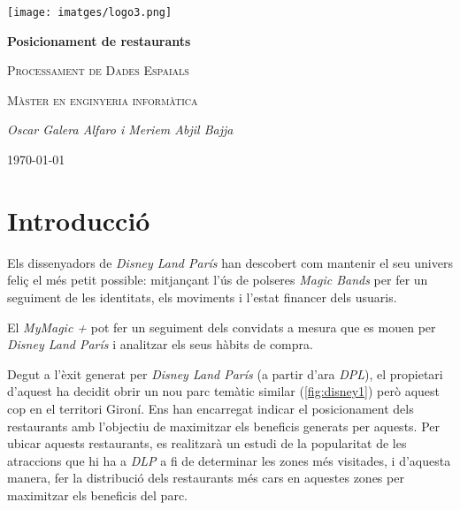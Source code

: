 \documentclass[12pt]{article}
\begin{document}
\begin{titlepage}
		\centering
		\texttt{[image: imatges/logo3.png]}\par\vspace{1cm}
		{\huge\bfseries Posicionament de restaurants\par}
		\vspace{0.3cm}
		{\scshape\Large Processament de Dades Espaials\par}
		\vspace{0.2cm}
		{\scshape\Large Màster en enginyeria informàtica\par}
		\vspace{1.5cm}
		{\Large\itshape Oscar Galera Alfaro i Meriem Abjil Bajja\par}
		\vfill
		{\large \today\par}
\end{titlepage}
\tableofcontents

\clearpage

\listoffigures

\clearpage

\section{Introducció}

Els dissenyadors de \textit{Disney Land París} han descobert com mantenir el seu univers feliç el més petit possible: mitjançant l'ús de polseres \textit{Magic Bands} per fer un seguiment de les identitats, els moviments i l'estat financer dels usuaris.

El \textit{MyMagic +}  pot fer un seguiment dels convidats a mesura que es mouen per \textit{Disney Land París} i analitzar els seus hàbits de compra.

Degut a l'èxit generat per \textit{Disney Land París} (a partir d'ara \textit{DPL}), el propietari d'aquest ha decidit obrir un nou parc temàtic similar (\ref{fig:disney1}) però aquest cop en el territori Gironí. Ens han encarregat indicar el posicionament dels restaurants amb l'objectiu de maximitzar els beneficis generats per aquests. Per ubicar aquests restaurants, es realitzarà un estudi de la popularitat de les atraccions que hi ha a \textit{DLP} a fi de determinar les zones més visitades, i d'aquesta manera, fer la distribució dels restaurants més cars en aquestes zones per maximitzar els beneficis del parc.
\end{document}
